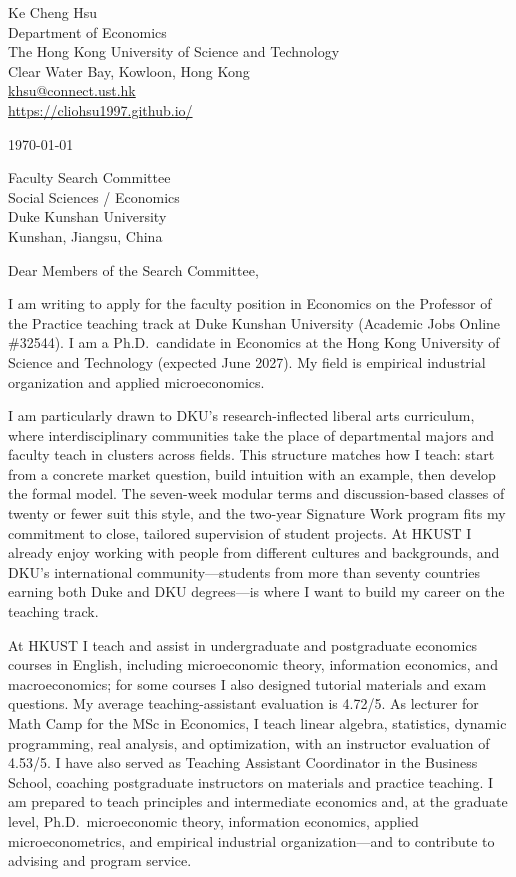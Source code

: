 \documentclass[11pt]{article}
\begin{document}
\begin{flushleft}
Ke Cheng Hsu \\
Department of Economics \\
The Hong Kong University of Science and Technology \\
Clear Water Bay, Kowloon, Hong Kong \\
\href{mailto:khsu@connect.ust.hk}{khsu@connect.ust.hk} \\
\href{https://cliohsu1997.github.io/}{https://cliohsu1997.github.io/}
\end{flushleft}

\vspace{0.4em}
\today

\vspace{0.6em}
Faculty Search Committee \\
Social Sciences / Economics \\
Duke Kunshan University \\
Kunshan, Jiangsu, China

\vspace{0.6em}
Dear Members of the Search Committee,

I am writing to apply for the faculty position in Economics on the Professor of the Practice teaching track at Duke Kunshan University (Academic Jobs Online \#32544). I am a Ph.D.\ candidate in Economics at the Hong Kong University of Science and Technology (expected June 2027). My field is empirical industrial organization and applied microeconomics.

I am particularly drawn to DKU's research-inflected liberal arts curriculum, where interdisciplinary communities take the place of departmental majors and faculty teach in clusters across fields. This structure matches how I teach: start from a concrete market question, build intuition with an example, then develop the formal model. The seven-week modular terms and discussion-based classes of twenty or fewer suit this style, and the two-year Signature Work program fits my commitment to close, tailored supervision of student projects. At HKUST I already enjoy working with people from different cultures and backgrounds, and DKU's international community---students from more than seventy countries earning both Duke and DKU degrees---is where I want to build my career on the teaching track.

At HKUST I teach and assist in undergraduate and postgraduate economics courses in English, including microeconomic theory, information economics, and macroeconomics; for some courses I also designed tutorial materials and exam questions. My average teaching-assistant evaluation is 4.72/5. As lecturer for Math Camp for the MSc in Economics, I teach linear algebra, statistics, dynamic programming, real analysis, and optimization, with an instructor evaluation of 4.53/5. I have also served as Teaching Assistant Coordinator in the Business School, coaching postgraduate instructors on materials and practice teaching. I am prepared to teach principles and intermediate economics and, at the graduate level, Ph.D.\ microeconomic theory, information economics, applied microeconometrics, and empirical industrial organization---and to contribute to advising and program service.
\end{document}
